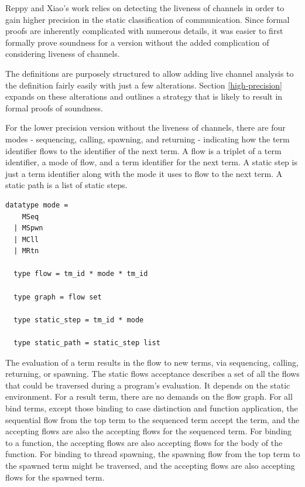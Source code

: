 \documentclass[letterpaper, 11pt]{extarticle}
\begin{document}
Reppy and Xiao's work relies on detecting the liveness of channels in order to gain higher
precision in the static classification of communication. Since formal proofs are inherently
complicated with numerous details, it was easier to first formally prove soundness for a
version without the added complication of considering liveness of channels.

The definitions are purposely structured to allow adding live channel analysis to the
definition fairly easily with just a few alterations. Section \ref{high-precision} expands on
these alterations and outlines a strategy that is likely to result in formal proofs of
soundness.

For the lower precision version without the liveness of channels, there are four modes -
sequencing, calling, spawning, and returning -
indicating how the term identifier flows to the identifier of the next term.
A flow is a triplet of a term identifier, a mode of flow, and a term identifier for the next term.
A static step is just a term identifier along with the mode it uses to
flow to the next term. A static path is a list of static steps. 

\begin{lstlisting}[language=logic, mathescape]
  datatype mode =
    MSeq
  | MSpwn
  | MCll
  | MRtn

  type flow = tm_id * mode * tm_id

  type graph = flow set

  type static_step = tm_id * mode

  type static_path = static_step list
\end{lstlisting}

The evaluation of a term results in the flow to new terms,
via sequencing, calling, returning, or spawning.
The static flows acceptance describes a set of all the flows
that could be traversed during a program's evaluation.
It depends on the static environment.
For a result term, there are no demands on the flow graph. For all bind terms, except those binding
to case distinction and function application, the sequential flow from the top term to
the sequenced term accept the term, and the accepting flows are also the
accepting flows for the sequenced term. For binding to a function, the
accepting flows are also accepting flows for the body of the function.
For binding to thread spawning, the spawning flow from the top term
to the spawned term might be traversed, and the accepting flows are also
accepting flows for the spawned term.
\end{document}
